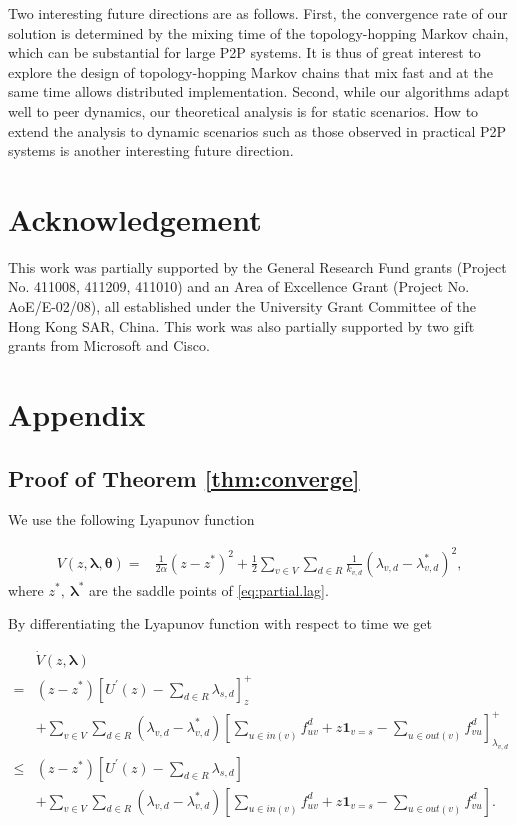 \documentclass[10pt,conference]{IEEEtran}
\begin{document}
Two interesting future directions are as follows. First,
the convergence rate of our solution is determined by the mixing time
of the topology-hopping Markov chain, which can be substantial for
large P2P systems. It is thus of great interest to explore the
design of topology-hopping Markov chains that mix fast and at the
same time allows distributed implementation. Second, while our algorithms adapt well to peer dynamics, our theoretical analysis is for static scenarios. How to extend the analysis to dynamic scenarios such as those observed in practical P2P systems \cite{wang2008stable} is another interesting future direction.

\section*{Acknowledgement}

This work was partially supported by the General Research Fund grants (Project No.
411008, 411209, 411010) and an Area of Excellence Grant (Project No.
AoE/E-02/08), all established under the University Grant Committee
of the Hong Kong SAR, China. This work was also partially supported
by two gift grants from Microsoft and Cisco.




\appendices
\section*{Appendix}

\subsection{Proof of Theorem \ref{thm:converge}} \label{sec:proof_converge}

We use the following Lyapunov function

\begin{align*}
V(z,\boldsymbol{\lambda},\boldsymbol{\theta})= & \frac{1}{2\alpha}(z-z^{*})^{2}+\frac{1}{2}\sum_{v\in V}\sum_{d\in R}\frac{1}{k_{v,d}}(\lambda_{v,d}-\lambda_{v,d}^{*})^{2},\end{align*}
where $z^{*},\:\boldsymbol{\lambda}^{*}$ are the saddle points
of \eqref{eq:partial.lag}.

By differentiating the Lyapunov function with respect to time we get

\begin{align}
 & \dot{V}(z,\boldsymbol{\lambda})\nonumber \\
= & (z-z^{*})\left[U^{'}(z)-\sum_{d\in R}\lambda_{s,d}\right]_{z}^{+}\nonumber \\
 & +\sum_{v\in V}\sum_{d\in R}(\lambda_{v,d}-\lambda_{v,d}^{*})\left[\sum_{u\in in(v)}f_{uv}^{d}+z\mathbf{1}_{v=s}-\sum_{u\in out(v)}f_{vu}^{d}\right]_{\lambda_{v,d}}^{+}\nonumber \\
\leq & (z-z^{*})\left[U^{'}(z)-\sum_{d\in R}\lambda_{s,d}\right]\nonumber \\
 & +\sum_{v\in V}\sum_{d\in R}(\lambda_{v,d}-\lambda_{v,d}^{*})\left[\sum_{u\in in(v)}f_{uv}^{d}+z\mathbf{1}_{v=s}-\sum_{u\in out(v)}f_{vu}^{d}\right].\label{eq:diff.inequality1}\end{align}
\end{document}
